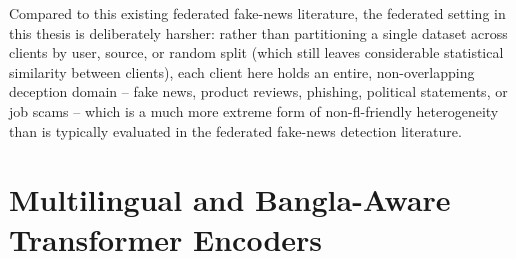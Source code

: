 Compared to this existing federated fake-news literature, the federated setting in this thesis is deliberately harsher: rather than partitioning a single dataset across clients by user, source, or random split (which still leaves considerable statistical similarity between clients), each client here holds an entire, non-overlapping deception domain -- fake news, product reviews, phishing, political statements, or job scams -- which is a much more extreme form of non-\gls{fl}-friendly heterogeneity than is typically evaluated in the federated fake-news detection literature.

\section{Multilingual and Bangla-Aware Transformer Encoders}

